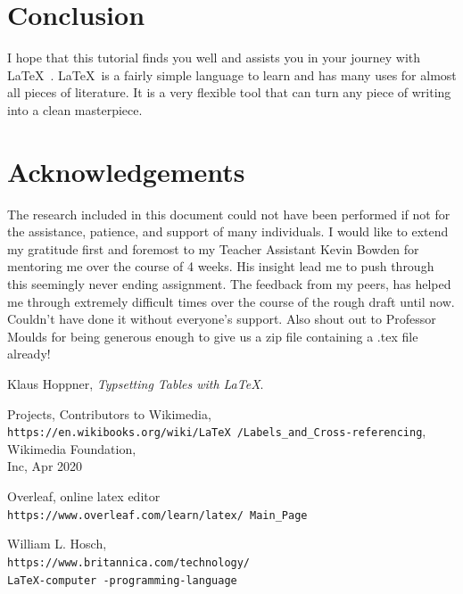 \documentclass[12pt,journal,compsoc]{IEEEtran}
\begin{document}
\section{Conclusion}
I hope that this tutorial finds you well and assists you in your journey with \LaTeX\ . \LaTeX\ is a fairly simple language to learn and has many uses for almost all pieces of literature. It is a very flexible tool that can turn any piece of writing into a clean masterpiece.

\section{Acknowledgements}
The research included in this document could not have been performed if not for the assistance, patience, and support of many individuals.  I would like to extend my gratitude first and foremost to my Teacher Assistant Kevin Bowden for mentoring me over the course of 4 weeks.  His insight lead me to push through this seemingly never ending assignment. The feedback from my peers, has helped me through extremely difficult times over the course of the rough draft until now. Couldn't have done it without everyone's support. Also shout out to Professor Moulds for being generous enough to give us a zip file containing a .tex file already!


\begin{thebibliography}{9}
Klaus Hoppner,
\textit{Typsetting Tables with \LaTeX}. 

Projects, Contributors to Wikimedia,
\\\texttt{https://en.wikibooks.org/wiki/LaTeX
/Labels_and_Cross-referencing},
Wikimedia Foundation, \\
Inc, Apr 2020

Overleaf, online latex editor \\\texttt{https://www.overleaf.com/learn/latex/
Main_Page}

 William L. Hosch, 
 \\\texttt{https://www.britannica.com/technology/\\LaTeX-computer
 -programming-language}

\end{thebibliography}

 










\end{document}
